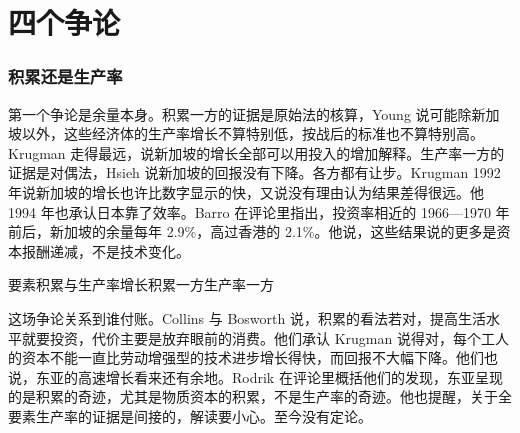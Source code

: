 \section{四个争论}\label{sec:eastasia-debate}

\subsubsection{积累还是生产率}

第一个争论是余量本身。积累一方的证据是原始法的核算，Young 说可能除新加坡以外，这些经济体的生产率增长不算特别低，按战后的标准也不算特别高\cite{young1994}。Krugman 走得最远，说新加坡的增长全部可以用投入的增加解释\cite{krugman1994}。生产率一方的证据是对偶法，Hsieh 说新加坡的回报没有下降\cite{hsieh2002}。各方都有让步。Krugman 1992 年说新加坡的增长也许比数字显示的快，又说没有理由认为结果差得很远\cite{young1992}。他 1994 年也承认日本靠了效率\cite{krugman1994}。Barro 在评论里指出，投资率相近的 1966—1970 年前后，新加坡的余量每年 2.9\%，高过香港的 2.1\%\cite{young1992}。他说，这些结果说的更多是资本报酬递减，不是技术变化\cite{young1992}。

\begin{compare}{要素积累与生产率增长}{积累一方}{生产率一方}
\end{compare}

这场争论关系到谁付账。Collins 与 Bosworth 说，积累的看法若对，提高生活水平就要投资，代价主要是放弃眼前的消费\cite{collinsbosworth1996}。他们承认 Krugman 说得对，每个工人的资本不能一直比劳动增强型的技术进步增长得快，而回报不大幅下降\cite{collinsbosworth1996}。他们也说，东亚的高速增长看来还有余地\cite{collinsbosworth1996}。Rodrik 在评论里概括他们的发现，东亚呈现的是积累的奇迹，尤其是物质资本的积累，不是生产率的奇迹\cite{collinsbosworth1996}。他也提醒，关于全要素生产率的证据是间接的，解读要小心\cite{collinsbosworth1996}。至今没有定论。

